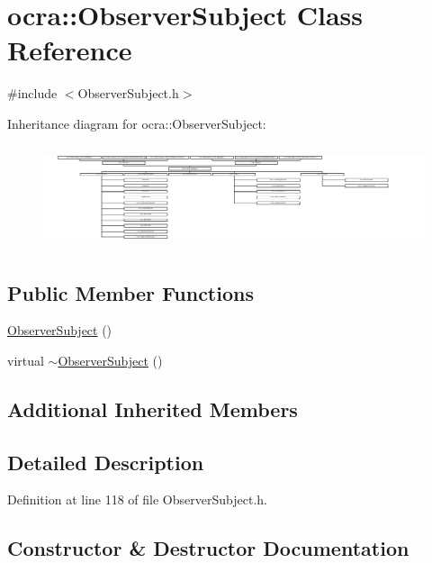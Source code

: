\hypertarget{classocra_1_1ObserverSubject}{}\section{ocra\+:\+:Observer\+Subject Class Reference}
\label{classocra_1_1ObserverSubject}


{\ttfamily \#include $<$Observer\+Subject.\+h$>$}

Inheritance diagram for ocra\+:\+:Observer\+Subject\+:\begin{figure}[H]
\begin{center}
\leavevmode
\includegraphics[height=3.043478cm]{d3/d16/classocra_1_1ObserverSubject}
\end{center}
\end{figure}
\subsection*{Public Member Functions}
\begin{DoxyCompactItemize}
\item 
\hyperlink{classocra_1_1ObserverSubject_ac2fe2208f340a71da5821952c26460ec}{Observer\+Subject} ()
\item 
virtual \hyperlink{classocra_1_1ObserverSubject_a1017c89ce175d262f42324cb76ed5f3b}{$\sim$\+Observer\+Subject} ()
\end{DoxyCompactItemize}
\subsection*{Additional Inherited Members}


\subsection{Detailed Description}


Definition at line 118 of file Observer\+Subject.\+h.



\subsection{Constructor \& Destructor Documentation}
\hypertarget{classocra_1_1ObserverSubject_ac2fe2208f340a71da5821952c26460ec}{}\label{classocra_1_1ObserverSubject_ac2fe2208f340a71da5821952c26460ec} 
